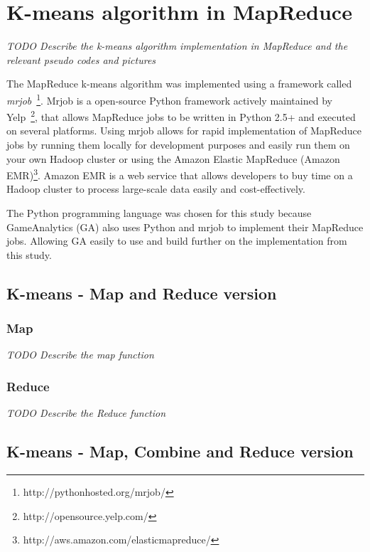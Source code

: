 \lipsum[1-3]


\section{K-means algorithm in MapReduce}
\textit{TODO Describe the k-means algorithm implementation in MapReduce and the relevant pseudo codes and pictures}

The MapReduce k-means algorithm was implemented using a framework called \textit{mrjob}~\footnote{http://pythonhosted.org/mrjob/}. Mrjob is a open-source Python framework actively maintained by Yelp~\footnote{http://opensource.yelp.com/}, that allows MapReduce jobs to be written in Python 2.5+ and executed on several platforms. Using mrjob allows for rapid implementation of MapReduce jobs by running them locally for development purposes and easily run them on your own Hadoop cluster or using the Amazon Elastic MapReduce (Amazon EMR)\footnote{http://aws.amazon.com/elasticmapreduce/}. Amazon EMR is a web service that allows developers to buy time on a Hadoop cluster to process large-scale data easily and cost-effectively.

The Python programming language was chosen for this study because GameAnalytics (GA) also uses Python and mrjob to implement their MapReduce jobs. Allowing GA easily to use and build further on the implementation from this study. 

\lipsum[1-2]


\subsection{K-means - Map and Reduce version}
\lipsum[1]

\subsubsection{Map}
\textit{TODO Describe the map function}

\lipsum[1-2]


\subsubsection{Reduce}
\textit{TODO Describe the Reduce function}

\lipsum[7-8]

\subsection{K-means - Map, Combine and Reduce version}
\lipsum[1]

